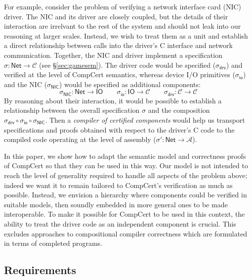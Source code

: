 \documentclass[11pt,oneside,draft]{book}
\theoremstyle{definition}
\newcommand{\kw}[1]{\ensuremath{ \mathsf{#1} }}
\begin{document}
For example,
consider the problem of verifying
a network interface card (NIC) driver.
The NIC and its driver are closely coupled,
but the details of their interaction
are irrelvant to the rest of the system
and should not leak into our reasoning at larger scales.
Instead,
we wish to treat them as a unit
and establish a direct relationship between calls into
the driver's C interface and network communication.
Together, the NIC and driver implement
a specification $\sigma :
\kw{Net} \rightarrow \mathcal{C}$ (see \S\ref{sec:gamesem}). %
The driver code would be specified
($\sigma_\kw{drv}$)
and verified
at the level of CompCert semantics,
whereas device I/O primitives
($\sigma_\kw{io}$)
and the NIC
($\sigma_\kw{NIC}$)
would be specified as additional components:
\[
  \sigma_\kw{NIC} : \kw{Net} \rightarrow \kw{IO}
  \qquad
  \sigma_\kw{io} : \kw{IO} \rightarrow \mathcal{C}
  \qquad
  \sigma_\kw{drv} : \mathcal{C} \rightarrow \mathcal{C}
\]
By reasoning about their interaction,
it would be possible to establish a relationship between
the overall specification $\sigma$ and
the composition
$\sigma_\kw{drv} \circ \sigma_\kw{io} \circ \sigma_\kw{NIC}$.
Then a \emph{compiler of certified components}
would help us transport specifications and proofs
obtained with respect to the driver's C code
to the compiled code operating at the level of assembly
($\sigma' : \kw{Net} \rightarrow \mathcal{A}$).

In this paper, we show how to adapt
the semantic model and correctness proofs of CompCert
so that they can be used in this way.
Our model is not intended to reach the level of generality
required to handle all aspects of the problem above;
indeed we want it to remain tailored to CompCert's
verification as much as possible.
Instead, we envision a hierarchy
where components could be verified in suitable models,
then soundly embedded in more general ones
to be made interoperable.
To make it possible for CompCert to be used in this context,
the ability to treat the driver code as an
independent component is crucial.
This excludes approaches to
compositional compiler correctness
which are formulated in terms of completed programs.


\subsection{Requirements} \label{sec:compcertreq} %
\end{document}

